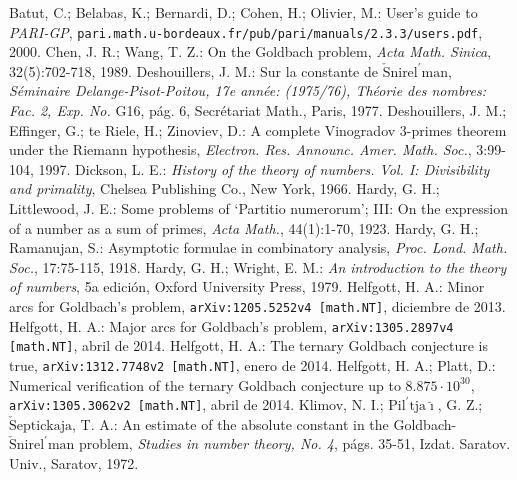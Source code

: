 \documentclass[11pt,a4paper,openright,oneside]{article}
\numberwithin{equation}{section}
\theoremstyle{definition}
\begin{document}
\begin{thebibliography}{25}
     Batut, C.; Belabas, K.; Bernardi, D.; Cohen, H.; Olivier, M.: User's guide to \textit{PARI-GP},  \newline \texttt{pari.math.u-bordeaux.fr/pub/pari/manuals/2.3.3/users.pdf}, 2000.
     Chen, J. R.; Wang, T. Z.: On the Goldbach problem, \textit{Acta Math. Sinica}, 32(5):702-718, 1989.
     Deshouillers, J. M.: Sur la constante de $\check{\text{S}}\text{nirel}^{\prime} \text{man}$, \textit{S\'eminaire Delange-Pisot-Poitou, 17e ann\'ee: (1975/76), Th\'eorie des nombres: Fac. 2, Exp. No.} G16, p\'ag. 6, Secr\'etariat Math., Paris, 1977.
     Deshouillers, J. M.; Effinger, G.; te Riele, H.; Zinoviev, D.: A complete Vinogradov 3-primes theorem under the Riemann hypothesis, \textit{Electron. Res. Announc. Amer. Math. Soc.}, 3:99-104, 1997.
     Dickson, L. E.: \textit{History of the theory of numbers. Vol. I: Divisibility and primality}, Chelsea Publishing Co., New York, 1966.
     Hardy, G. H.; Littlewood, J. E.: Some problems of \textquoteleft Partitio numerorum\textquoteright; III: On the expression of a number as a sum of primes, \textit{Acta Math.}, 44(1):1-70, 1923.
     Hardy, G. H.; Ramanujan, S.: Asymptotic formulae in combinatory analysis, \textit{Proc. Lond. Math. Soc.}, 17:75-115, 1918.
     Hardy, G. H.; Wright, E. M.: \textit{An introduction to the theory of numbers}, 5a edici\'on, Oxford University Press, 1979.
     Helfgott, H. A.: Minor arcs for Goldbach's problem, \newline \texttt{arXiv:1205.5252v4 [math.NT]}, diciembre de 2013.
     Helfgott, H. A.: Major arcs for Goldbach's problem, \newline \texttt{arXiv:1305.2897v4 [math.NT]}, abril de 2014.
     Helfgott, H. A.: The ternary Goldbach conjecture is true, \newline \texttt{arXiv:1312.7748v2 [math.NT]}, enero de 2014.
     Helfgott, H. A.; Platt, D.: Numerical verification of the ternary Goldbach conjecture up to $8.875 \cdot 10^{30}$, \texttt{arXiv:1305.3062v2 [math.NT]}, abril de 2014.
     Klimov, N. I.; $\text{Pil}^{\prime} \text{tja}\breve{\imath}$, G. Z.; $\check{\text{S}}\text{eptickaja}$, T. A.: An estimate of the absolute constant in the Goldbach-$\check{\text{S}}\text{nirel}^{\prime} \text{man}$ problem, \textit{Studies in number theory, No. 4}, p\'ags. 35-51, Izdat. Saratov. Univ., Saratov, 1972.

\end{thebibliography}
\end{document}
